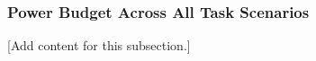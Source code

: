 
\subsubsection{Power Budget Across All Task Scenarios}
\label{subsubsec:design_11_2_power_budget_scenarios}

[Add content for this subsection.]
